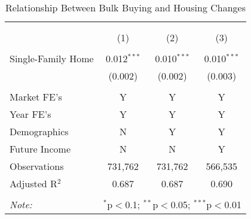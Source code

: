 
\begin{table}[!htbp] \centering 
  \caption{Relationship Between Bulk Buying and Housing Changes} 
  \label{tab:storageCosts} 
\begin{tabular}{@{\extracolsep{5pt}}lccc} 
\\[-1.8ex]\hline 
\hline \\[-1.8ex] 
\\[-1.8ex] & (1) & (2) & (3)\\ 
\hline \\[-1.8ex] 
 Single-Family Home & 0.012$^{***}$ & 0.010$^{***}$ & 0.010$^{***}$ \\ 
  & (0.002) & (0.002) & (0.003) \\ 
 \hline \\[-1.8ex] 
Market FE's & Y & Y & Y \\ 
Year FE's & Y & Y & Y \\ 
Demographics & N & Y & Y \\ 
Future Income & N & N & Y \\ 
Observations & 731,762 & 731,762 & 566,535 \\ 
Adjusted R$^{2}$ & 0.687 & 0.687 & 0.690 \\ 
\hline 
\hline \\[-1.8ex] 
\textit{Note:}  & \multicolumn{3}{l}{$^{*}$p$<$0.1; $^{**}$p$<$0.05; $^{***}$p$<$0.01} \\ 
\end{tabular} 
\end{table} 
